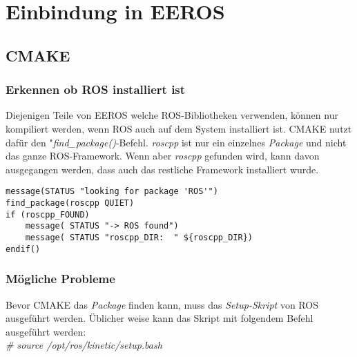 \chapter{Einbindung in EEROS}


\section{CMAKE}
\subsection{Erkennen ob ROS installiert ist}
Diejenigen Teile von EEROS welche ROS-Bibliotheken verwenden, können nur kompiliert werden, wenn ROS auch auf dem System installiert ist.
CMAKE nutzt dafür den "\textit{find\_package()}-Befehl.
\textit{roscpp} ist nur ein  einzelnes \textit{Package} und nicht das ganze ROS-Framework.
Wenn aber \textit{roscpp} gefunden wird, kann davon ausgegangen werden, dass auch das restliche Framework installiert wurde.

\lstset{language=c}
\begin{lstlisting}
message(STATUS "looking for package 'ROS'")
find_package(roscpp QUIET)
if (roscpp_FOUND)
	message( STATUS "-> ROS found")
	message( STATUS "roscpp_DIR:  " ${roscpp_DIR})
endif()
\end{lstlisting}

\subsection{Mögliche Probleme}
Bevor CMAKE das \textit{Package} finden kann, muss das \textit{Setup-Skript} von ROS ausgeführt werden.
Üblicher weise kann das Skript mit folgendem Befehl ausgeführt werden:\\
\textit{\# source /opt/ros/kinetic/setup.bash}

